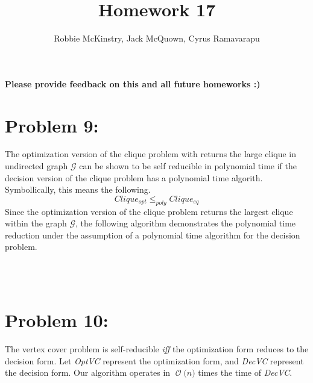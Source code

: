 \documentclass[12pt]{article}
\newcommand{\BigO}[1]{\ensuremath{\operatorname{\mathcal{O}}\bigl(#1\bigr)}}
\begin{document}
\title{Homework 17}
\author{Robbie McKinstry, Jack McQuown, Cyrus Ramavarapu}
\renewcommand{\today}{17 October 2016}
\renewcommand{\baselinestretch}{1.5}
\maketitle

\textbf{Please provide feedback on this and all future homeworks :) }

\section*{Problem 9:}
The optimization version of the clique problem with returns the large clique in
undirected graph $\mathcal{G}$ can be shown to be self reducible in polynomial
time if the decision version of the clique problem has a polynomial time algorith.
Symbollically, this means the following.
\[
Clique_{opt} \leq_{poly} Clique_{eq}
\]
Since the optimization version of the clique problem returns the largest clique within
the graph $\mathcal{G}$, the following algorithm demonstrates the polynomial time
reduction under the assumption of a polynomial time algorithm for the decision problem.\\
\begin{algorithm}[H]
\\
\\
\end{algorithm}


\section*{Problem 10:}
The vertex cover problem is self-reducible \textit{iff} the optimization form reduces to the decision form. Let \textit{OptVC} represent the optimization form, and \textit{DecVC} represent the decision form. Our algorithm operates in \BigO{n} times the time of \textit{DecVC}.
\end{document}
